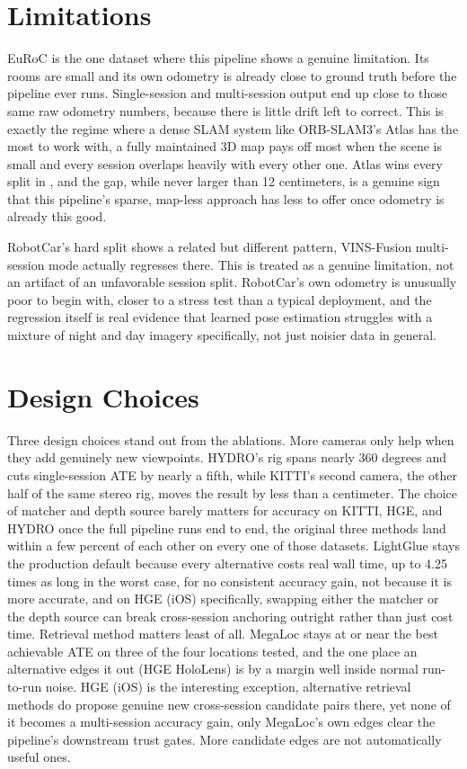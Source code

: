 \section{Limitations}
\label{sec:discussion-limitations}

EuRoC is the one dataset where this pipeline shows a genuine limitation. Its rooms are small and
its own odometry is already close to ground truth before the pipeline ever runs. Single-session
and multi-session output end up close to those same raw odometry numbers, because there is little
drift left to correct. This is exactly the regime where a dense SLAM system like ORB-SLAM3's Atlas
has the most to work with, a fully maintained 3D map pays off most when the scene is small and
every session overlaps heavily with every other one. Atlas wins every split in
, and the gap, while never larger than 12 centimeters, is a
genuine sign that this pipeline's sparse, map-less approach has less to offer once odometry is
already this good.

RobotCar's hard split shows a related but different pattern, VINS-Fusion multi-session mode
actually regresses there. This is treated as a genuine limitation, not an artifact of an
unfavorable session split. RobotCar's own odometry is unusually poor to begin with, closer to a
stress test than a typical deployment, and the regression itself is real evidence that learned
pose estimation struggles with a mixture of night and day imagery specifically, not just noisier
data in general.

\section{Design Choices}
\label{sec:discussion-design}

Three design choices stand out from the ablations. More cameras only help when they add genuinely
new viewpoints. HYDRO's rig spans nearly 360 degrees and cuts single-session ATE by nearly a
fifth, while KITTI's second camera, the other half of the same stereo rig, moves the result by
less than a centimeter. The choice of matcher and depth source barely matters for accuracy on
KITTI, HGE, and HYDRO once the full pipeline runs end to end, the original three methods land
within a few percent of each other on every one of those datasets. LightGlue stays the production
default because every alternative costs real wall time, up to 4.25 times as long in the worst
case, for no consistent accuracy gain, not because it is more accurate, and on HGE (iOS)
specifically, swapping either the matcher or the depth source can break cross-session anchoring
outright rather than just cost time. Retrieval method matters least of all. MegaLoc stays at or
near the best achievable ATE on three of the four locations tested, and the one place an
alternative edges it out (HGE HoloLens) is by a margin well inside normal run-to-run noise. HGE
(iOS) is the interesting exception, alternative retrieval methods do propose genuine new
cross-session candidate pairs there, yet none of it becomes a multi-session accuracy gain, only
MegaLoc's own edges clear the pipeline's downstream trust gates. More candidate edges are not
automatically useful ones.

